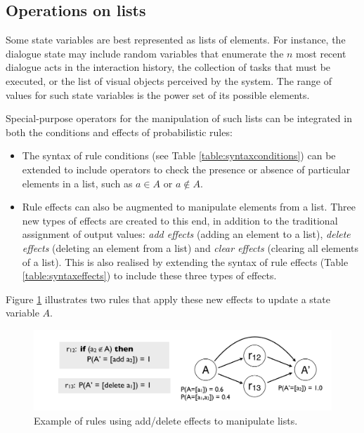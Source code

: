 \subsection{Operations on lists}

Some state variables are best represented as lists of elements. For instance, the dialogue state may include random variables that enumerate  the $n$ most recent dialogue acts in the interaction history, the collection of tasks that must be executed, or the list of visual objects perceived by the system.  The range of values for such state variables is the power set of its possible elements. 

Special-purpose operators for the manipulation of such lists can be integrated in both the conditions and effects of probabilistic rules: 
\begin{itemize}
\item The syntax of rule conditions (see Table \ref{table:syntaxconditions}) can be extended to include operators to check the presence or absence of particular elements in a list, such as $a \in A$ or $a \notin A$. 
\item Rule effects can also be augmented to manipulate elements from a list.  Three new types of effects are created to this end, in addition to the traditional assignment of output values: \textit{add effects} (adding an element to a list), \textit{delete effects} (deleting an element from a list) and \textit{clear effects} (clearing all elements of a list). This is also realised by extending the syntax of rule effects (Table \ref{table:syntaxeffects}) to include these three types of effects. 
\end{itemize}

Figure \ref{fig:seteffects} illustrates two rules that apply these new effects to update a state variable $A$. 
 
\begin{figure}[ht]
\centering
\includegraphics[scale=0.25]{imgs/seteffects.pdf}
\caption{Example of rules using add/delete effects to manipulate lists.}
\label{fig:seteffects}
\end{figure}

